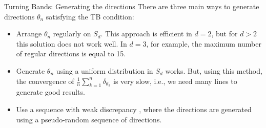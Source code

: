\begin{frame}{Turning Bands: Generating the directions}
There are three main ways to generate directions $\theta_n$ satisfying the TB condition:
\begin{itemize}
 \item Arrange $\theta_n$ regularly on $S_d$. This approach is efficient in $d=2$, but for $d>2$
 this solution does not work well. In $d=3$, for example, the maximum number of regular directions is equal to 15.
 \item Generate $\theta_n$ using a uniform distribution in $S_d$ works. 
 But, using this method, the convergence of $\frac{1}{n}\sum_{k=1}^{n}\delta_{\theta_k}$
 is very slow, i.e., we need many lines to generate good results.
 \item Use a sequence with weak discrepancy \cite{freulon1994conditional}, where the directions are generated using a pseudo-random sequence of directions.
 \end{itemize}

\end{frame}


 

